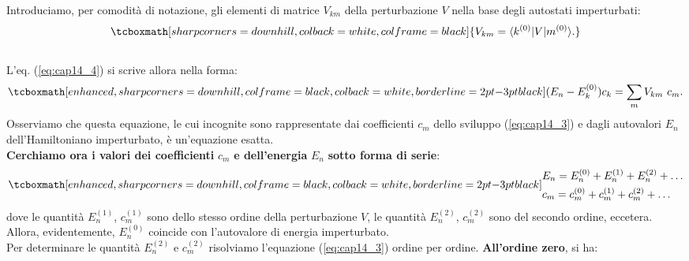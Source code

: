 Introduciamo, per comodità di notazione, gli elementi di matrice $V_{km}$ della perturbazione $V$ nella base degli autostati imperturbati:
	\begin{equation}
		\tcboxmath[sharp corners=downhill, colback=white, colframe=black]{
			V_{km} = \langle k^{(0)}\vert V\vert m^{(0)}\rangle.
			}
	\end{equation}\\
	
L'eq. (\ref{eq:cap14_4}) si scrive allora nella forma:
	\begin{equation}
		\tcboxmath[enhanced, sharp corners=downhill, colframe=black, colback=white, borderline={2pt}{-3pt}{black}]{
		(E_n - E_k ^{(0)}) c_k = \sum _m V_{km}\ c_m .
		}
	\label{eq:cap14_5}
	\end{equation}
Osserviamo che questa equazione, le cui incognite sono rappresentate dai coefficienti $c_m$ dello sviluppo (\ref{eq:cap14_3}) e dagli autovalori $E_n$ dell'Hamiltoniano imperturbato, è un'equazione esatta.\\

\textbf{Cerchiamo ora i valori dei coefficienti} $c_m$ \textbf{e dell'energia} $E_n$ \textbf{sotto forma di serie}:
	\begin{equation}
		\tcboxmath[enhanced, sharp corners=downhill, colframe=black, colback=white, borderline={2pt}{-3pt}{black}]{
		\begin{aligned}
			& E_n = E_n ^{(0)}+E_n ^{(1)}+E_n ^{(2)}+\dots  \\
			& c_m = c_m ^{(0)}+c_m ^{(1)}+c_m ^{(2)}+\dots
		\end{aligned}
		}
	\end{equation}
dove le quantità $E_n ^{(1)}$, $c_m ^{(1)}$ sono dello stesso ordine della perturbazione $V$, le quantità $E_n ^{(2)}$, $c_m ^{(2)}$ sono del secondo ordine, eccetera. Allora, evidentemente, $E_n ^{(0)}$ coincide con l'autovalore di energia imperturbato.\\

Per determinare le quantità $E_n ^{(2)}$ e $c_m ^{(2)}$ risolviamo l'equazione (\ref{eq:cap14_3}) ordine per ordine. \textbf{All'ordine zero}, si ha:\\

